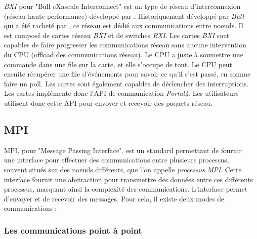 \emph{BXI} pour "Bull eXascale Interconnect" est un type de réseau d'interconnexion (réseau haute performance) développé par \atos{}.
Historiquement développé par \emph{Bull} qui a été racheté par \atos{}, ce réseau est dédié aux communications entre noeuds.
Il est composé de cartes réseau \emph{BXI} et de switches \emph{BXI}.
Les cartes \emph{BXI} sont capables de faire progresser les communications réseau sans aucune intervention du CPU (offload des communications réseau).
Le CPU a juste à soumettre une commande dans une file sur la carte, et elle s'occupe de tout.
Le CPU peut ensuite récupérer une file d'événements pour savoir ce qu'il s'est passé, en somme faire un poll.
Les cartes sont également capables de déclencher des interruptions.
Les cartes implémente donc l'API de communication \emph{Portal4}.
Les utilisateurs utilisent donc cette API pour envoyer et recevoir des paquets réseau.


\subsection{MPI}

MPI, pour "Message Passing Interface", est un standard permettant de fournir une interface pour effectuer des communications entre plusieurs processus, souvent situés sur des noeuds différents, que l'on appelle \emph{processus MPI}.
Cette interface fournit une abstraction pour transmettre des données entre ces différents processus, masquant ainsi la complexité des communications.
L'interface permet d'envoyer et de recevoir des messages. Pour cela, il existe deux modes de communications :

\subsubsection{Les communications point à point}

